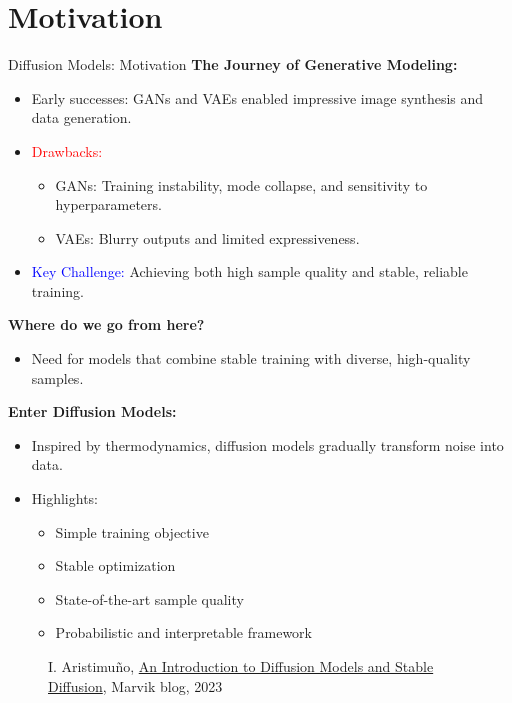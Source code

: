 \section{Motivation}
\begin{frame}[allowframebreaks]{Diffusion Models: Motivation}
    \textbf{The Journey of Generative Modeling:}
    \begin{itemize}
        \item Early successes: GANs and VAEs enabled impressive image synthesis and data generation.
        \item \textcolor{red}{Drawbacks:} 
        \begin{itemize}
            \item GANs: Training instability, mode collapse, and sensitivity to hyperparameters.
            \item VAEs: Blurry outputs and limited expressiveness.
        \end{itemize}
        \item \textcolor{blue}{Key Challenge:} Achieving both high sample quality and stable, reliable training.
    \end{itemize}

\framebreak

    \textbf{Where do we go from here?}
    \begin{itemize}
        \item Need for models that combine stable training with diverse, high-quality samples.
    \end{itemize}
    \vspace{0.5em}
    \textbf{Enter Diffusion Models:}
    \begin{itemize}
        \item Inspired by thermodynamics, diffusion models gradually transform noise into data.
        \item \textcolor[rgb]{0,0.6,0}{Highlights:} 
        \begin{itemize}
            \item Simple training objective
            \item Stable optimization
            \item State-of-the-art sample quality
            \item Probabilistic and interpretable framework
        \end{itemize}
    \end{itemize}
\end{frame}

\begin{frame}[allowframebreaks]{}
    \begin{figure}
        \centering
        \caption*{\scriptsize I. Aristimu\~{n}o, \href{https://www.marvik.ai/blog/an-introduction-to-diffusion-models-and-stable-diffusion}{An Introduction to Diffusion Models and Stable Diffusion}, Marvik blog, 2023}
    \end{figure}
\end{frame}